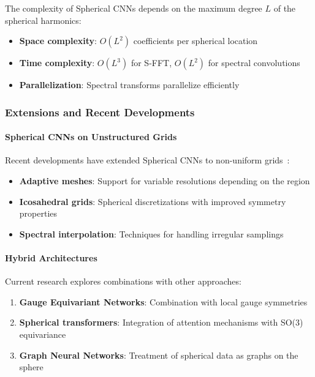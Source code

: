 The complexity of Spherical CNNs depends on the maximum degree $L$ of the spherical harmonics:

\begin{itemize}
    \item \textbf{Space complexity}: $O(L^2)$ coefficients per spherical location
    \item \textbf{Time complexity}: $O(L^3)$ for S-FFT, $O(L^2)$ for spectral convolutions
    \item \textbf{Parallelization}: Spectral transforms parallelize efficiently
\end{itemize}

\subsubsection{Extensions and Recent Developments}

\paragraph{Spherical CNNs on Unstructured Grids}

Recent developments have extended Spherical CNNs to non-uniform grids~\citep{cohen2021spherical}:

\begin{itemize}
    \item \textbf{Adaptive meshes}: Support for variable resolutions depending on the region
    \item \textbf{Icosahedral grids}: Spherical discretizations with improved symmetry properties
    \item \textbf{Spectral interpolation}: Techniques for handling irregular samplings
\end{itemize}

\paragraph{Hybrid Architectures}

Current research explores combinations with other approaches:

\begin{enumerate}
    \item \textbf{Gauge Equivariant Networks}: Combination with local gauge symmetries~\citep{cohen2019gaugeequivariantconvolutional}
    \item \textbf{Spherical transformers}: Integration of attention mechanisms with SO(3) equivariance
    \item \textbf{Graph Neural Networks}: Treatment of spherical data as graphs on the sphere
\end{enumerate}

